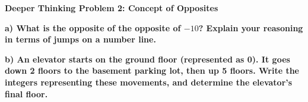 \documentclass[12pt, letterpaper, fleqn]{article}
\begin{document}
\begin{tcolorbox}[colback=black!5, colframe=black!50, boxrule=1pt, arc=4mm, left=6mm, right=6mm, top=5mm, bottom=5mm]
\textbf{Deeper Thinking Problem 2: Concept of Opposites}

\medskip

\noindent
\textbf{a) What is the opposite of the opposite of $-10$? Explain your reasoning in terms of jumps on a number line.}

\vspace{2cm}

\noindent
\textbf{b) An elevator starts on the ground floor (represented as 0). It goes down 2 floors to the basement parking lot, then up 5 floors. Write the integers representing these movements, and determine the elevator's final floor.}

\vspace{2cm}
\end{tcolorbox}
\newpage
\end{document}
